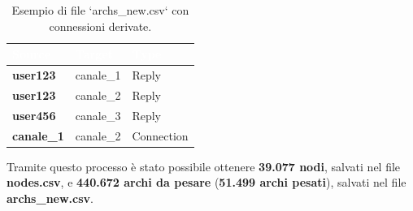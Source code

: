 \documentclass[12pt]{article}
\begin{document}
	\begin{table}[H]
		\centering
		\begin{tabular}{|p{5cm}|p{4cm}|p{4cm}|}
			\hline
			\cellcolor{darkblue}\textcolor{white}{\textbf{Source}} & 
			\cellcolor{darkblue}\textcolor{white}{\textbf{Target}} & 
			\cellcolor{darkblue}\textcolor{white}{\textbf{Type}} \\
			\hline
			\textbf{user123} & canale\_1 & Reply \\
			\hline
			\textbf{user123} & canale\_2 & Reply\\
			\hline
			\textbf{user456} & canale\_3 & Reply\\
			\hline
			\textbf{canale\_1} & canale\_2 & Connection\\
			\hline
		\end{tabular}
		\caption{Esempio di file `archs\_new.csv` con connessioni derivate.}
		\label{tab:archs_new}
	\end{table}
	Tramite questo processo è stato possibile ottenere \textbf{39.077 nodi}, salvati nel file \textbf{nodes.csv}, e \textbf{440.672 archi da pesare} (\textbf{51.499 archi pesati}), salvati nel file \textbf{archs\_new.csv}.
	\newpage
\end{document}
